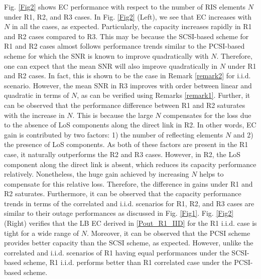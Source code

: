 \documentclass[journal,draftclsnofoot,onecolumn,12pt]{IEEEtran}
\begin{document}
Fig. \ref{Fig2} shows EC performance with respect to the number of RIS elements $N$ under R1, R2, and R3 cases. In Fig. \ref{Fig2} (Left), we see that EC increases with $N$ in all the cases, as expected. Particularly, the capacity increases rapidly in R1 and R2 cases compared to R3. 
This may be because the SCSI-based scheme  for R1 and R2 cases almost follows  performance trends similar to  the PCSI-based scheme for which the SNR is known to improve quadratically with $N$. Therefore, one can expect that the mean SNR will also improve quadratically in $N$ under R1 and R2 cases. In fact, this is shown to be the case in Remark \ref{remark2} for {\rm i.i.d.} scenario. However, the mean SNR in R3 improves with order between linear  and quadratic   in terms of $N$, as can be verified using Remarks \ref{remark1}.
Further, it can be observed that the performance difference between R1 and R2 saturates with the increase in $N$. This is because the large $N$ compensates for the loss due to the absence of LoS components along the direct link in R2. In other words, EC gain is contributed by two factors: 1) the number of reflecting elements $N$ and 2) the presence of LoS components. As both of these factors are present in the R1 case, it naturally outperforms the R2 and R3 cases. However, in R2, the LoS component along the direct link is absent, which reduces its capacity performance relatively. Nonetheless, the huge gain achieved by increasing $N$ helps to compensate for this relative loss. Therefore, the difference in gains under R1 and R2 saturates. Furthermore, it can be observed that the capacity performance trends in terms of the correlated and {\rm i.i.d.} scenarios for R1, R2, and R3 cases are similar to their outage performances as discussed in Fig. \ref{Fig1}. Fig. \ref{Fig2} (Right) verifies that the LB EC derived in \eqref{Pout_R1_IID} for the R1 {\rm i.i.d.} case is tight for a wide range of $N$. Moreover, it can be observed that the PCSI scheme provides better capacity than the SCSI scheme, as expected. However, unlike the correlated and {\rm i.i.d.} scenarios of R1 having equal performances under the SCSI-based scheme, R1 {\rm i.i.d.} performs better than R1 correlated case under the PCSI-based scheme. %
\end{document}
